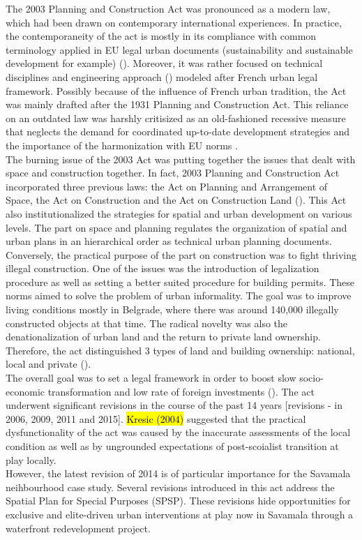 \documentclass[11pt]{report}
\begin{document}
\begin{itemize}
The 2003 Planning and Construction Act was pronounced as a modern law, which had been drawn on contemporary international experiences. In practice, the contemporaneity of the act is mostly in its compliance with common terminology applied in EU legal urban documents (sustainability and sustainable development for example) (\cite{Zakon 2003}).
Moreover, it was rather focused on technical disciplines and engineering approach (\cite{waves of planning 2006}) modeled after French urban legal framework.
Possibly because of the influence of French urban tradition, the Act was mainly drafted after the 1931 Planning and Construction Act.
This reliance on an outdated law was harshly critisized as an old-fashioned  recessive measure that neglects the demand for coordinated up-to-date development strategies and the importance of the harmonization with EU norms \cite{ref}.
\\
The burning issue of the 2003 Act was putting together the issues that dealt with space and construction together. In fact, 2003 Planning and Construction Act incorporated three previous laws: the Act on Planning and Arrangement of Space, the Act on Construction and the Act on Construction Land (\cite{ref}).
This Act also institutionalized the strategies for spatial and urban development on various levels.
The part on space and planning regulates the organization of spatial and urban plans in an hierarchical order as technical urban planning documents.
Conversely, the practical purpose of the part on construction was to fight thriving illegal construction.
One of the issues was the introduction of legalization procedure as well as setting a better suited procedure for building permits. 
These norms aimed to solve the problem of urban informality.
The goal was to improve living conditions mostly in Belgrade, where there was around 140,000 illegally constructed objects at that time.
The radical novelty was also the denationalization of urban land and the return to private land ownership. Therefore, the act distinguished 3 types of land and building ownership: national, local and private (\cite{Vujosevic and Nedovic Budic 2006}).
\\
The overall goal was to set a legal framework in order to boost slow socio-economic transformation and low rate of foreign investments (\cite{Vujovic and Petrovic 2007}).
The act underwent significant revisions in the course of the past 14 years [revisions - in 2006, 2009, 2011 and 2015].
\hl{Kresic (2004)} suggested that the practical dysfunctionality of the act was caused by the inaccurate assessments of the local condition as well as by ungrounded expectations of post-scoialist transition at play locally.
\\
However, the latest revision of 2014 is of particular importance for the Savamala neihbourhood case study. Several revisions introduced in this act address the Spatial Plan for Special Purposes (SPSP). These revisions hide opportunities for exclusive and elite-driven urban interventions at play now in Savamala through a waterfront redevelopment project. 


\end{itemize}
\end{document}
